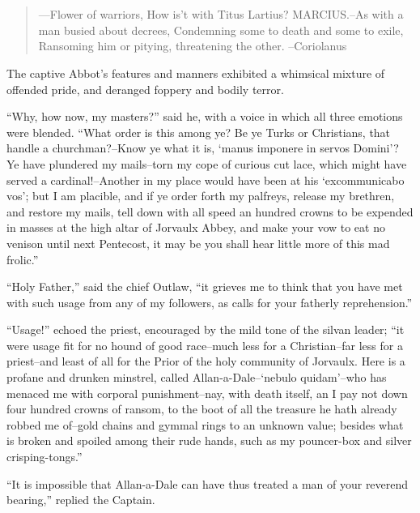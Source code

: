 \chapter{}

\begin{quote}
---Flower of warriors,
How is't with Titus Lartius?
MARCIUS.--As with a man busied about decrees,
Condemning some to death and some to exile,
Ransoming him or pitying, threatening the other.
--Coriolanus
\end{quote}

The captive Abbot's features and manners exhibited a whimsical mixture
of offended pride, and deranged foppery and bodily terror.

``Why, how now, my masters?'' said he, with a voice in which all three
emotions were blended. ``What order is this among ye? Be ye Turks or
Christians, that handle a churchman?--Know ye what it is, `manus
imponere in servos Domini'? Ye have plundered my mails--torn my cope of
curious cut lace, which might have served a cardinal!--Another in my
place would have been at his `excommunicabo vos'; but I am placible, and
if ye order forth my palfreys, release my brethren, and restore my
mails, tell down with all speed an hundred crowns to be expended in
masses at the high altar of Jorvaulx Abbey, and make your vow to eat no
venison until next Pentecost, it may be you shall hear little more of
this mad frolic.''

``Holy Father,'' said the chief Outlaw, ``it grieves me to think that
you have met with such usage from any of my followers, as calls for your
fatherly reprehension.''

``Usage!'' echoed the priest, encouraged by the mild tone of the silvan
leader; ``it were usage fit for no hound of good race--much less for a
Christian--far less for a priest--and least of all for the Prior of the
holy community of Jorvaulx. Here is a profane and drunken minstrel,
called Allan-a-Dale--`nebulo quidam'--who has menaced me with corporal
punishment--nay, with death itself, an I pay not down four hundred
crowns of ransom, to the boot of all the treasure he hath already robbed
me of--gold chains and gymmal rings to an unknown value; besides what is
broken and spoiled among their rude hands, such as my pouncer-box and
silver crisping-tongs.''

``It is impossible that Allan-a-Dale can have thus treated a man of your
reverend bearing,'' replied the Captain.

